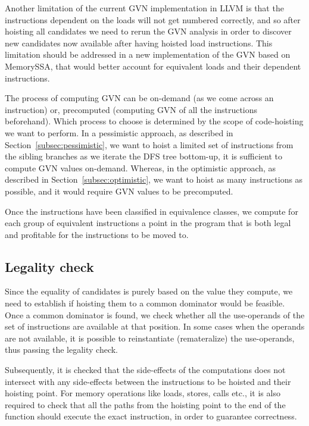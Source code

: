 \documentclass{sig-alternate}
\begin{document}
Another limitation of the current GVN implementation in LLVM is that the
instructions dependent on the loads will not get numbered correctly, and so
after hoisting all candidates we need to rerun the GVN analysis in order to
discover new candidates now available after having hoisted load instructions.
This limitation should be addressed in a new implementation of the GVN based on
MemorySSA, that would better account for equivalent loads and their dependent
instructions.

The process of computing GVN can be on-demand (as we come across an instruction)
or, precomputed (computing GVN of all the instructions beforehand). Which
process to choose is determined by the scope of code-hoisting we want to
perform. In a pessimistic approach, as described in
Section~\ref{subsec:pessimistic}, we want to hoist a limited set of instructions
from the sibling branches as we iterate the DFS tree bottom-up, it is sufficient
to compute GVN values on-demand. Whereas, in the optimistic approach, as
described in Section~\ref{subsec:optimistic}, we want to hoist as many
instructions as possible, and it would require GVN values to be precomputed.

Once the instructions have been classified in equivalence classes, we compute
for each group of equivalent instructions a point in the program that is both
legal and profitable for the instructions to be moved to.

\subsection{Legality check}
\label{subsec:legality}
Since the equality of candidates is purely based on the value they compute, we
need to establish if hoisting them to a common dominator would be feasible. Once
a common dominator is found, we check whether all the use-operands of the set of
instructions are available at that position. In some cases when the operands are not
available, it is possible to reinstantiate (remateralize) the use-operands, thus
passing the legality check.

Subsequently, it is checked that the side-effects of the computations does not
intersect with any side-effects between the instructions to be hoisted and their
hoisting point. For memory operations like loads, stores, calls etc., it is also
required to check that all the paths from the hoisting point to the end of the
function should execute the exact instruction, in order to guarantee
correctness.
\end{document}
